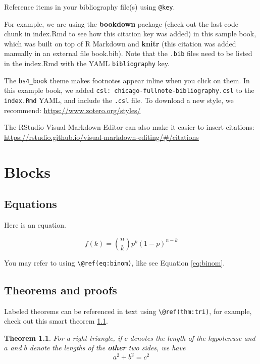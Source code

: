 \documentclass[
]{report}
\newtheorem{theorem}{Theorem}[chapter]
\theoremstyle{definition}
\theoremstyle{definition}
\theoremstyle{definition}
\theoremstyle{definition}
\theoremstyle{remark}
\begin{document}
Reference items in your bibliography file(s) using \texttt{@key}.

For example, we are using the \textbf{bookdown} package \citep{R-bookdown} (check out the last code chunk in index.Rmd to see how this citation key was added) in this sample book, which was built on top of R Markdown and \textbf{knitr} \citep{xie2015} (this citation was added manually in an external file book.bib).
Note that the \texttt{.bib} files need to be listed in the index.Rmd with the YAML \texttt{bibliography} key.

The \texttt{bs4\_book} theme makes footnotes appear inline when you click on them. In this example book, we added \texttt{csl:\ chicago-fullnote-bibliography.csl} to the \texttt{index.Rmd} YAML, and include the \texttt{.csl} file. To download a new style, we recommend: \url{https://www.zotero.org/styles/}

The RStudio Visual Markdown Editor can also make it easier to insert citations: \url{https://rstudio.github.io/visual-markdown-editing/\#/citations}

\hypertarget{blocks}{%
\chapter{Blocks}\label{blocks}}

\hypertarget{equations}{%
\section{Equations}\label{equations}}

Here is an equation.

\begin{equation} 
  f\left(k\right) = \binom{n}{k} p^k\left(1-p\right)^{n-k}
  \label{eq:binom}
\end{equation}

You may refer to using \texttt{\textbackslash{}@ref(eq:binom)}, like see Equation \eqref{eq:binom}.

\hypertarget{theorems-and-proofs}{%
\section{Theorems and proofs}\label{theorems-and-proofs}}

Labeled theorems can be referenced in text using \texttt{\textbackslash{}@ref(thm:tri)}, for example, check out this smart theorem \ref{thm:tri}.

\begin{theorem}
\protect\hypertarget{thm:tri}{}\label{thm:tri}For a right triangle, if \(c\) denotes the \emph{length} of the hypotenuse
and \(a\) and \(b\) denote the lengths of the \textbf{other} two sides, we have
\[a^2 + b^2 = c^2\]
\end{theorem}
\end{document}
